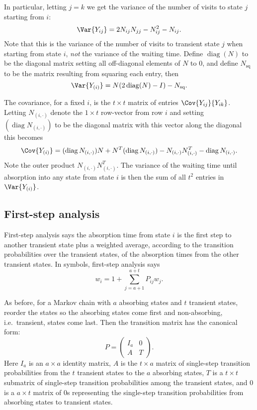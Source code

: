 \documentclass[12pt]{article}
\begin{document}
In particular, letting \( j=k \) we get the variance of the number of
visits to state \( j \) starting from \( i \):
\[
    \Var{Y_{ij}} = 2 N_{ij}N_{jj} - N_{ij}^2 - N_{ij}.
\] Note that this is the variance of the number of visits to transient
state \( j \) when starting from state \( i \), \emph{not} the variance
of the waiting time. Define \(
\operatorname{diag}
(N) \) to be the diagonal matrix setting all off-diagonal elements of \(
N \) to \( 0 \), and define \( N_{\text{sq}} \) to be the matrix
resulting from squaring each entry, then
\[
    \Var{Y_{(i)}} = N(2
    \operatorname{diag}
    (N) - I) - N_{\text{sq}}.
\]

The covariance, for a fixed \( i \), is the \( t \times t \) matrix of
entries \( \Cov{Y_{ij}}{ Y_{ik}} \).  Letting \( N_{(i,\cdot)} \) denote
the \( 1 \times t \) row-vector from row \( i \) and setting \( (
\operatorname{diag}
N_{(i,\cdot)}) \) to be the diagonal matrix with this vector along the
diagonal this becomes
\[
    \Cov{Y_{(i)}} = (
    \operatorname{diag}
    {N_{(i,\cdot)}}) N + N^T (
    \operatorname{diag}
    {N_{(i,\cdot)}}) - N_{(i,\cdot)} N_{(i,\cdot)}^T -
    \operatorname{diag}
    N_{(i,\cdot)}.
\] Note the outer product \( N_{(i,\cdot)} N_{(i,\cdot)}^T \). The
variance of the waiting time until absorption into any state from state \(
i \) is then the sum of all \( t^2 \) entries in \( \Var{Y_{(i)}} \).

\subsection*{First-step analysis}

First-step analysis%
says the absorption time from state \( i \) is the first step to another
transient state plus a weighted average, according to the transition
probabilities over the transient states, of the absorption times from
the other transient states.  In symbols, first-step analysis says
\[
    w_i = 1 + \sum\limits_{j=a+1}^{a+t} P_{ij} w_j.
\]

As before, for a Markov chain with \( a \) absorbing states and \( t \)
transient states, reorder the states so the absorbing states come first
and non-absorbing, i.e.\ transient, states come last.  Then the
transition matrix has the canonical form:
\[
    P =
    \begin{pmatrix}
        I_a & 0 \\
        A & T
    \end{pmatrix}
    .
\] Here \( I_{a} \) is an \( a \times a \) identity matrix, \( A \) is
the \( t \times a \) matrix of single-step transition probabilities from
the \( t \) transient states to the \( a \) absorbing states, \( T \) is
a \( t \times t \) submatrix of single-step transition probabilities
among the transient states, and \( 0 \) is a \( a \times t \) matrix of \(
0 \)s representing the single-step transition probabilities from
absorbing states to transient states.
\end{document}
